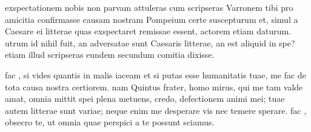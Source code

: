 


 exspectationem nobis non parvam attuleras cum scripseras Varronem tibi pro amicitia confirmasse causam nostram Pompeium certe suscepturum et, simul a Caesare ei litterae quas exspectaret remissae essent, actorem etiam daturum. utrum id nihil fuit, an adversatae sunt Caesaris litterae, an est aliquid in spe? etiam illud scripseras eundem secundum comitia dixisse.

 fac , si vides quantis in malis iaceam et si putas esse humanitatis tuae, me fac de tota causa nostra certiorem. nam Quintus frater, homo mirus, qui me tam valde amat, omnia mittit spei plena metuens, credo, defectionem animi mei; tuae autem litterae sunt variae; neque enim me desperare vis nec temere sperare. fac , obsecro te, ut omnia quae perspici a te possunt sciamus.
